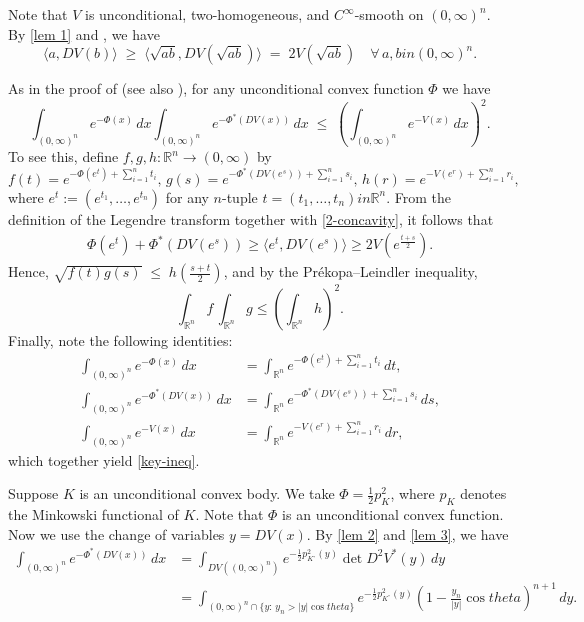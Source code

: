 \documentclass[12pt]{amsart}
\def\theta{theta}%
\def\in{in }%
\numberwithin{equation}{section}
\newcommand{\8}{\infty}
\renewcommand{\(}{\left(}
\renewcommand{\)}{\right)}
\newcommand{\eq}[1]{\begin{equation}\begin{alignedat}{2} #1 \end{alignedat}\end{equation}}
\begin{document}
Note that $V$ is unconditional, two-homogeneous, and $C^{\infty}$-smooth on $(0,\infty)^n$. 
By \autoref{lem 1} and \cite[Lem. 5.17]{CKLR24}, we have
\begin{equation}\label{2-concavity}
    \langle a, DV(b) \rangle \;\geq\; \langle \sqrt{ab}, DV(\sqrt{ab}) \rangle 
    \;=\; 2 V(\sqrt{ab}) 
    \quad \forall\, a,b \in (0,\infty)^n.
\end{equation}

As in the proof of \cite[Thm. 5.19]{CKLR24} (see also \cite[Prop. 1]{FM07}), 
for any unconditional convex function $\Phi$ we have
\begin{equation}\label{key-ineq}
    \int_{(0,\infty)^n} e^{-\Phi(x)}\,dx 
    \int_{(0,\infty)^n} e^{-\Phi^{\ast}(DV(x))}\,dx 
    \;\leq\;
    \left( \int_{(0,\infty)^n} e^{-V(x)}\,dx \right)^2.
\end{equation}
To see this, define $f,g,h : \mathbb{R}^n \to (0,\infty)$ by
\begin{equation*}
    f(t) = e^{-\Phi(e^t) + \sum_{i=1}^n t_i},\, g(s) = e^{-\Phi^{\ast}(DV(e^s)) + \sum_{i=1}^n s_i},\, h(r) = e^{-V(e^r) + \sum_{i=1}^n r_i},
\end{equation*}
where $e^t := (e^{t_1}, \ldots, e^{t_n})$ for any $n$-tuple $t=(t_1,\ldots,t_n) \in \mathbb{R}^n$. From the definition of the Legendre transform together with \eqref{2-concavity}, 
it follows that
\eq{
\Phi(e^t)+\Phi^{\ast}(DV(e^s))\geq \langle e^t,DV(e^s)\rangle\geq  2V(e^{\frac{t+s}{2}}).
}
Hence, $\sqrt{f(t) g(s)} \;\leq\; h\!\left(\tfrac{s+t}{2}\right)$, and by the Pr\'ekopa--Leindler inequality,
\begin{equation*}
    \int_{\mathbb{R}^n} f \,\int_{\mathbb{R}^n} g 
    \leq
    \left( \int_{\mathbb{R}^n} h \right)^2.
\end{equation*}
Finally, note the following identities:
\begin{align*}
    \int_{(0,\infty)^n} e^{-\Phi(x)}\,dx 
    &= \int_{\mathbb{R}^n} e^{-\Phi(e^t) + \sum_{i=1}^n t_i}\,dt, \\
    \int_{(0,\infty)^n} e^{-\Phi^{\ast}(DV(x))}\,dx 
    &= \int_{\mathbb{R}^n} e^{-\Phi^{\ast}(DV(e^s)) + \sum_{i=1}^n s_i}\,ds, \\
    \int_{(0,\infty)^n} e^{-V(x)}\,dx 
    &= \int_{\mathbb{R}^n} e^{-V(e^r) + \sum_{i=1}^n r_i}\,dr,
\end{align*}
which together yield \eqref{key-ineq}.

Suppose $K$ is an unconditional convex body. We take $\Phi = \frac{1}{2} p_K^2$, where $p_K$ denotes the Minkowski functional of $K$. Note that $\Phi$ is an unconditional convex function. Now we use the change of variables $y=DV(x)$. By \autoref{lem 2} and \autoref{lem 3}, we have
\eq{
\int_{(0,\infty)^n} e^{-\Phi^{\ast}(DV(x))}\, dx &= \int_{DV((0,\infty)^n)} e^{-\frac{1}{2} p_{K^{\circ}}^2(y)} \det D^2 V^{\ast}(y)\, dy\\
&= \int_{(0,\infty)^n \cap \{ y :\, y_n > |y| \cos \theta \}} e^{-\frac{1}{2} p_{K^{\circ}}^2(y)} \left( 1 - \frac{y_n}{|y|} \cos \theta \right)^{n+1} \, dy.
}
\end{document}

